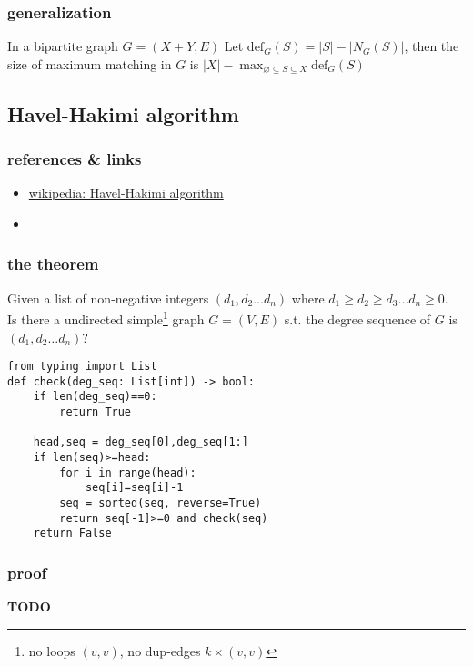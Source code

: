 \documentclass{article}
\begin{document}
\subsubsection{generalization}

In a bipartite graph $G=(X+Y,E)$
Let $\mathrm{def}_G(S)=|S|-|N_G(S)|$,
then the size of maximum matching in $G$ is $|X|-\max_{\varnothing\subseteq S\subseteq X}\mathrm{def}_G(S)$

\newpage

\subsection{Havel-Hakimi algorithm}

\subsubsection{references \& links}

\begin{itemize}
	\item \href{https://en.wikipedia.org/wiki/Havel\%E2\%80\%93Hakimi\_algorithm}{wikipedia: Havel-Hakimi algorithm}
	\item \href{https://en.wikipedia.org/wiki/Erd\%C5\%91s\%E2\%80\%93Gallai\_theorem}{}
\end{itemize}

\subsubsection{the theorem}

Given a list of non-negative integers $(d_1,d_2\ldots d_n)$ where $d_1\geq d_2\geq d_3\ldots d_n\geq 0$.\\
Is there a undirected simple\footnote{no loops $(v,v)$, no dup-edges $k\times (v,v)$} graph $G=(V,E)$ s.t. the degree sequence of $G$ is $(d_1,d_2\ldots d_n)$?

\begin{verbatim}
from typing import List
def check(deg_seq: List[int]) -> bool:
    if len(deg_seq)==0:
        return True

    head,seq = deg_seq[0],deg_seq[1:]
    if len(seq)>=head:
        for i in range(head):
            seq[i]=seq[i]-1
        seq = sorted(seq, reverse=True)
        return seq[-1]>=0 and check(seq)
    return False
\end{verbatim}

\subsubsection{proof}

\textbf{TODO}
\end{document}
